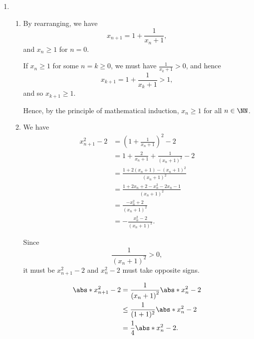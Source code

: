 \Question{\currfilebase}

\begin{enumerate}
    \item \begin{enumerate}
              \item By rearranging, we have
                    \[
                        x_{n + 1} = 1 + \frac{1}{x_n + 1},
                    \]
                    and \(x_n \geq 1\) for \(n = 0\).

                    If \(x_n \geq 1\) for some \(n = k \geq 0\), we must have \(\frac{1}{x_{k} + 1} > 0\), and hence
                    \[
                        x_{k + 1} = 1 + \frac{1}{x_k + 1} > 1,
                    \]
                    and so \(x_{k + 1} \geq 1\).

                    Hence, by the principle of mathematical induction, \(x_n \geq 1\) for all \(n \in \NN\).

              \item We have
                    \begin{align*}
                        x_{n + 1}^2 - 2 & = \left(1 + \frac{1}{x_n + 1}\right)^2 - 2                                           \\
                                        & = 1 + \frac{2}{x_n + 1} + \frac{1}{\left(x_n + 1\right)^2} - 2                       \\
                                        & = \frac{1 + 2 \left(x_n + 1\right) - \left(x_n + 1\right)^2}{\left(x_n + 1\right)^2} \\
                                        & = \frac{1 + 2 x_n + 2 - x_n^2 - 2x_n - 1}{\left(x_n + 1\right)^2}                    \\
                                        & = \frac{- x_n^2 + 2}{\left(x_n + 1\right)^2}                                         \\
                                        & = - \frac{x_n^2 - 2}{\left(x_n + 1\right)^2}.
                    \end{align*}

                    Since
                    \[
                        \frac{1}{\left(x_n + 1\right)^2} > 0,
                    \]
                    it must be \(x_{n + 1}^2 - 2\) and \(x_n^2 - 2\) must take opposite signs.

                    \begin{align*}
                        \abs*{x_{n + 1}^2 - 2} & = \frac{1}{\left(x_n + 1\right)^2} \abs*{x_n^2 - 2} \\
                                               & \leq \frac{1}{(1 + 1)^2} \abs*{x_n^2 - 2}           \\
                                               & = \frac{1}{4} \abs*{x_n^2 - 2}.
                    \end{align*}


\end{enumerate}
\end{enumerate}
